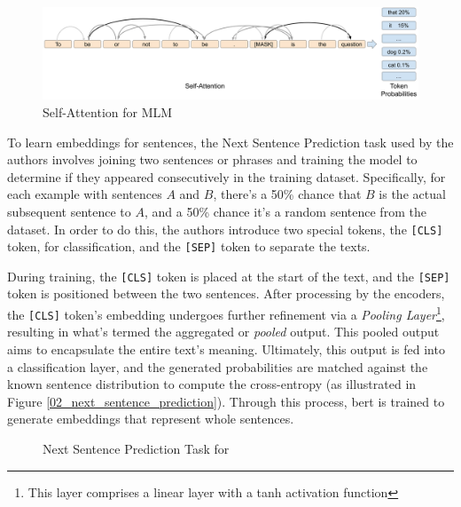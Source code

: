 \begin{figure}
    \centering
    \includegraphics[width=\textwidth]{Figures/02/02_mlm.png}
    \caption{Self-Attention for MLM}
    \label{fig:02_attention_mlm}
\end{figure}

\label{02_next_sentence_prediction}


To learn embeddings for sentences, the Next Sentence Prediction task used by the authors involves joining two sentences or phrases and training the model to determine if they appeared consecutively in the training dataset. 
Specifically, for each example with sentences $A$ and $B$, there's a 50\% chance that $B$ is the actual subsequent sentence to $A$, and a 50\% chance it's a random sentence from the dataset. 
In order to do this, the authors introduce two special tokens, the \texttt{[CLS]} token, for classification, and the \texttt{[SEP]} token to  separate the texts. 

During training, the \texttt{[CLS]} token is placed at the start of the text, and the \texttt{[SEP]} token is positioned between the two sentences. After processing by the encoders, the \texttt{[CLS]} token's embedding undergoes further refinement via a \emph{Pooling Layer}\footnote{This layer comprises a linear layer with a \gls{tanh} activation function}, resulting in what's termed the aggregated or \emph{pooled} output. This pooled output aims to encapsulate the entire text's meaning. Ultimately, this output is fed into a classification layer, and the generated probabilities are matched against the known sentence distribution to compute the cross-entropy (as illustrated in Figure \ref{02_next_sentence_prediction}). Through this process, \gls{bert} is trained to generate embeddings that represent whole sentences.



\begin{figure}
  \caption{Next Sentence Prediction Task for \BERT{}}
  \label{fig:02_next_sentence_prediction}
\end{figure}



